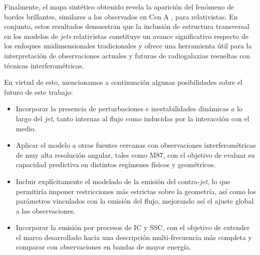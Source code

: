 	Finalmente, el mapa sintético obtenido revela la aparición del fenómeno de bordes brillantes, similares a los observados en Cen A \citep{2021NatAs...5.1017J}, para \jets relativistas.
	En conjunto, estos resultados demuestran que la inclusión de estructura transversal en los modelos de \textit{jets} relativistas constituye un avance significativo respecto de los enfoques unidimensionales tradicionales y ofrece una herramienta útil para la interpretación de observaciones actuales y futuras de radiogalaxias resueltas con técnicas interferométricas.

	En virtud de esto, mencionamos a continuaci\'on algunas posibilidades sobre el futuro de este trabajo:

\begin{itemize}
\item Incorporar la presencia de perturbaciones e inestabilidades dinámicas a lo largo del \textit{jet}, tanto internas al flujo como inducidas por la interacción con el medio.
\item Aplicar el modelo a otras fuentes cercanas con observaciones interferométricas de muy alta resolución angular, tales como M87, con el objetivo de evaluar su capacidad predictiva en distintos regímenes físicos y geométricos.
\item Incluir explícitamente el modelado de la emisión del contra-\textit{jet}, lo que permitiría imponer restricciones más estrictas sobre la geometría, así como los parámetros vinculados con la emisi\'on del flujo, mejorando así el ajuste global a las observaciones.
\item Incorporar la emisión por procesos de IC y SSC, con el objetivo de extender el marco desarrollado hacia una descripción multi-frecuencia más completa y comparar con observaciones en bandas de mayor energía.
\end{itemize}


